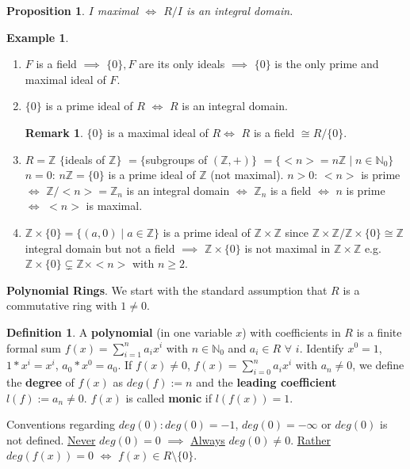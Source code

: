 \documentclass[11pt]{article}
\newtheorem{prop}[thm]{Proposition}
\theoremstyle{definition}
\newtheorem{definition}[thm]{Definition}
\newtheorem{example}[thm]{Example}
\newtheorem{remark}[thm]{Remark}
\numberwithin{equation}{section}
\newcommand{\Z}{\mathbb{Z}}
\newcommand{\N}{\mathbb{N}} %
\begin{document}
\begin{prop}
$I$ maximal $\Leftrightarrow$ $R/I$ is an integral domain.
\end{prop}

\begin{example}
\begin{enumerate}
    \item $F$ is a field $\implies$ $\{0\}, F$ are its only ideals $\implies$ $\{0\}$ is the only prime and maximal ideal of $F$.
    \item $\{0\}$ is a prime ideal of $R$ $\Leftrightarrow$ $R$ is an integral domain.
    \begin{remark}
    $\{0\}$ is a maximal ideal of $R \Leftrightarrow$ $R$ is a field $\cong R/\{0\}$.
    \end{remark}
    \item $R = \Z$ $\{$ideals of $\Z \}$ $= \{$subgroups of $(\Z, +)\}$ $= \{<n>=n\Z \mid n \in \N_{0} \}$\\
    $n = 0$: $n\Z = \{0\}$ is a prime ideal of $\Z$ (not maximal). $n > 0$: $<n>$ is prime $\Leftrightarrow$ $\Z/<n> = \Z_{n}$ is an integral domain $\Leftrightarrow$ $\Z_{n}$ is a field $\Leftrightarrow$ $n$ is prime $\Leftrightarrow$ $<n>$ is maximal.
    \item $\Z \times \{0\} = \{(a, 0) \mid a \in \Z\}$ is a prime ideal of $\Z \times \Z$ since $\Z \times \Z/\Z \times \{0\} \cong \Z$ integral domain but not a field $\implies$ $\Z \times \{0\}$ is not maximal in $\Z \times \Z$ e.g. $\Z \times \{0\} \subsetneq \Z \times <n>$ with $n \geq 2$.
\end{enumerate}
\end{example}

\textbf{Polynomial Rings}. We start with the standard assumption that $R$ is a commutative ring with $1 \neq 0$.
\begin{definition}
A \textbf{polynomial} (in one variable $x$) with coefficients in $R$ is a finite formal sum $f(x) = \sum_{i=1}^{n} a_{i}x^{i}$ with $n \in \N_{0}$ and $a_{i} \in R$ $\forall$ $i$. Identify $x^{0} = 1$, $1*x^{i} = x^{i}$, $a_{0}*x^{0} = a_{0}$. If $f(x) \neq 0$, $f(x) = \sum_{i=0}^{n}a_{i}x^{i}$ with $a_{n} \neq 0$, we define the \textbf{degree} of $f(x)$ as $deg(f):=n$ and the \textbf{leading coefficient} $l(f) := a_{n} \neq 0$. $f(x)$ is called \textbf{monic} if $l(f(x)) = 1$.
\end{definition}

Conventions regarding $deg(0): deg(0) = -1$, $deg(0) = -\infty$ or $deg(0)$ is not defined. \underline{Never} $deg(0) = 0$ $\implies$ \underline{Always} $deg(0) \neq 0$. \underline{Rather} $deg(f(x)) = 0$ $\Leftrightarrow$ $f(x) \in R \setminus \{0\}$.
\end{document}
